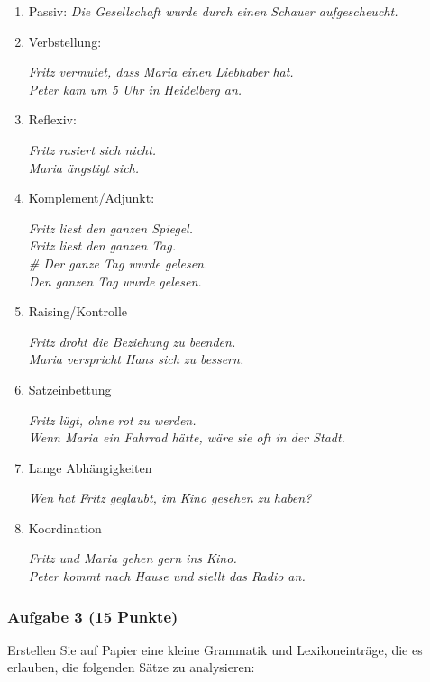 \documentclass[12pt]{article}
\begin{document}
{\small
\begin{enumerate}

\item Passiv: {\em Die Gesellschaft wurde durch einen Schauer aufgescheucht.}
\item Verbstellung:

 {\em Fritz vermutet, dass Maria einen Liebhaber hat.}\\
			   {\em Peter kam um 5 Uhr in Heidelberg an.}
\item Reflexiv: 

{\em Fritz rasiert sich nicht.}\\
{\em Maria \"angstigt sich.}
\item Komplement/Adjunkt: 

{\em Fritz liest den ganzen Spiegel.\\
 Fritz liest den ganzen Tag. \\
\# Der ganze Tag wurde gelesen. \\
Den ganzen Tag wurde gelesen.}
\item Raising/Kontrolle

{\em Fritz droht die Beziehung zu beenden.\\
Maria verspricht Hans sich zu bessern.}
\item Satzeinbettung

{\em Fritz l\"ugt, ohne rot zu werden. \\Wenn Maria ein Fahrrad h\"atte, w\"are sie oft in der Stadt.}
\item Lange Abh\"angigkeiten

{\em Wen hat Fritz geglaubt, im Kino gesehen zu haben?}
\item Koordination

{\em Fritz und Maria gehen gern ins Kino. \\
Peter kommt nach Hause und stellt das Radio an.}
\end{enumerate}
}
\subsubsection*{Aufgabe 3 \hfill (15 Punkte)}


Erstellen Sie auf Papier eine kleine Grammatik und Lexikoneintr\"age,
die es erlauben, die folgenden S\"atze zu analysieren:

				
\end{document}
